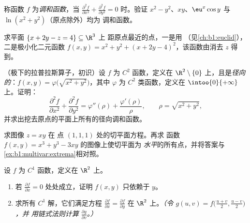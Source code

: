 \begin{exercise}[$\star\star$]\label{exo:b1:multivar:7}
称函数 $f$ 为\emph{调和函数}，当 $\frac{\partial^2 f}{\partial
x^2} + \frac{\partial^2 f}{\partial y^2} = 0$ 时。验证 $x^2 -
y^2$、$xy$、$\eu^x\cos y$ 与 $\ln(x^2 + y^2)$（原点除外）均为
调和函数。
\end{exercise}

\begin{exercise}[$\star\star\star$]\label{exo:b1:multivar:8}
求平面 $\{x + 2y - z = 4\} \subseteq \R^3$ 上
距原点最近的点，一是用
（见\cref{ch:b1:euclid}），二是极小化二元函数
$f(x, y) = x^2 + y^2 + (x + 2y - 4)^2$，该函数由消去 $z$ 得到。
\end{exercise}

\begin{exercise}[$\star\star\star$]\label{exo:b1:multivar:9}
（极下的拉普拉斯算子，初识）设 $f$ 为 $C^2$ 函数，定义在
$\R^2 \setminus \{0\}$ 上，且是\emph{径向的}：$f(x, y) =
\varphi\bigl(\sqrt{x^2+y^2}\bigr)$，其中 $\varphi$ 为 $C^2$ 类函数，定义在
$\intoo{0}{+\infty}$ 上。证明：
\[
\frac{\partial^2 f}{\partial x^2} + \frac{\partial^2 f}{\partial
y^2} = \varphi''(\rho) + \frac{\varphi'(\rho)}{\rho},
\qquad \rho = \sqrt{x^2 + y^2},
\]
并求出挖去原点的平面上所有的径向调和函数。
\end{exercise}

\begin{exercise}[$\star\star$]\label{exo:b1:multivar:10}
求图像 $z = xy$ 在
点 $(1, 1, 1)$ 处的切平面方程。再求
函数 $f(x,y) = x^3 + y^3 - 3xy$ 的图像上使切平面为
\emph{水平}的所有点，并将答案与
\cref{ex:b1:multivar:extrema}相对照。
\end{exercise}

\begin{exercise}[$\star\star$]\label{exo:b1:multivar:11}
设 $f$ 为 $C^1$ 函数，定义在 $\R^2$ 上。
\begin{enumerate}
  \item 若 $\frac{\partial f}{\partial x} = 0$ 处处成立，证明
        $f(x, y)$ 只依赖于 $y$。
  \item 求所有 $C^1$ 解，它们满足方程
        $\frac{\partial f}{\partial x} = \frac{\partial
        f}{\partial y}$ 在 $\R^2$ 上。\emph{（令 $g(u, v) =
        f\bigl(\frac{u+v}2, \frac{u-v}2\bigr)$，并
        用链式法则计算 $\frac{\partial g}{\partial v}$。）}
\end{enumerate}
\end{exercise}

